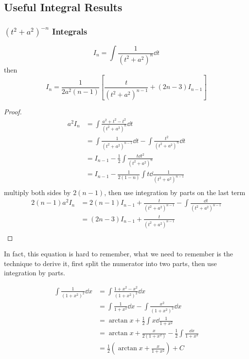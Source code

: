 \documentclass{overview}
\begin{document}
\subsection{Useful Integral Results}

\subsubsection{$(t^2 + a^2) ^{-n}$ Integrals}
\[
	I_n = \int \frac{1}{(t^2 + a^2)^n} \dd t
\]
then
\[
	I_n = \frac{1}{2a^2 (n-1)} \left[\frac{t}{(t^2 + a^2)^{n-1}} + (2n - 3) I_{n-1} \right]
\] 
\begin{proof}
	\[
		\begin{aligned}
			a^2 I_n 
			&= \int \frac{a^2 + t^2 - t^2}{(t^2 + a^2)^n} \dd t \\
			&= \int \frac{1}{(t^2 + a^2)^{n-1}} \dd t - \int \frac{t^2}{(t^2 + a^2)^n} \dd t \\
			&= I_{n-1} - \frac{1}{2} \int \frac{t\dd t^2}{(t^2 + a^2)^n} \\
			&= I_{n-1} - \frac{1}{2(1-n)} \int t\dd \frac{1}{(t^2 + a^2)^{n-1}} \\
		\end{aligned}
	\]
	multiply both sides by $2(n-1)$, then use integration by parts on the last term
	\[
		\begin{aligned}
			2(n-1) a^2 I_n
			&= 2(n-1) I_{n-1} + \frac{t}{(t^2 + a^2)^{n-1}} - \int \frac{\dd t}{(t^2 + a^2)^{n-1}} \\
			&= (2n - 3) I_{n-1} + \frac{t}{(t^2 + a^2)^{n-1}} \\
		\end{aligned}
	\] 
\end{proof}
In fact, this equation is hard to remember, what we need to remember is the
technique to derive it, first split the numerator into two parts, then use
integration by parts.
\begin{example}
	\[
		\begin{aligned}
			\int \frac{1}{(1+x^2)^2} \dd x
			&= \int \frac{1+x^2 - x^2}{(1+x^2)^2} \dd x \\
			&= \int \frac{1}{1+x^2} \dd x - \int \frac{x^2}{(1+x^2)^2} \dd x \\
			&= \arctan x + \frac{1}{2} \int x \dd \frac{1}{1+x^2} \\
			&= \arctan x + \frac{x}{2(1+x^2)} - \frac{1}{2} \int \frac{\dd x}{1+x^2} \\
			&= \frac{1}{2}\left(\arctan x + \frac{x}{1+x^2}\right) + C
		\end{aligned}
	\] 
\end{example}
\end{document}
